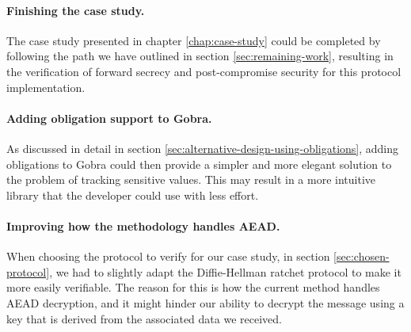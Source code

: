 \paragraph{Finishing the case study.}
The case study presented in chapter \ref{chap:case-study} could be completed by following the path we have outlined in section \ref{sec:remaining-work}, resulting in the verification of forward secrecy and post-compromise security for this protocol implementation.

\paragraph{Adding obligation support to Gobra.}
As discussed in detail in section \ref{sec:alternative-design-using-obligations}, adding obligations to Gobra could then provide a simpler and more elegant solution to the problem of tracking sensitive values.
This may result in a more intuitive library that the developer could use with less effort.

\paragraph{Improving how the methodology handles AEAD.}
When choosing the protocol to verify for our case study, in section \ref{sec:chosen-protocol}, we had to slightly adapt the Diffie-Hellman ratchet protocol to make it more easily verifiable.
The reason for this is how the current method handles AEAD decryption, and it might hinder our ability to decrypt the message using a key that is derived from the associated data we received.